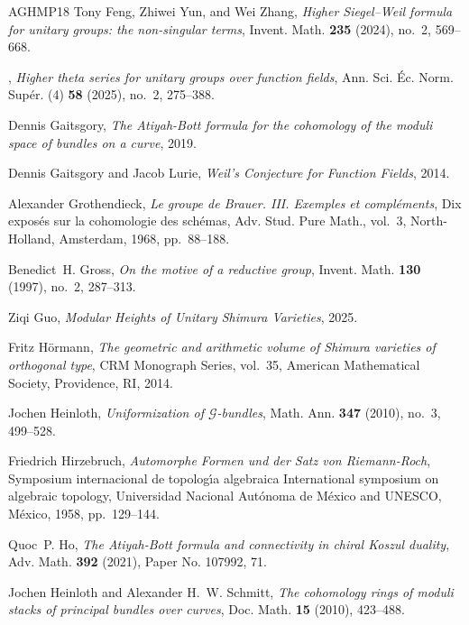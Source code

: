 \documentclass[reqno]{amsart}
\numberwithin{equation}{subsection}
\theoremstyle{definition}
\begin{document}
\begin{thebibliography}{AGHMP18}
Tony Feng, Zhiwei Yun, and Wei Zhang, \emph{Higher {S}iegel--{W}eil formula for
  unitary groups: the non-singular terms}, Invent. Math. \textbf{235} (2024),
  no.~2, 569--668.

\bysame, \emph{Higher theta series for unitary groups over function fields},
  Ann. Sci. \'{E}c. Norm. Sup\'{e}r. (4) \textbf{58} (2025), no.~2, 275--388.

Dennis Gaitsgory, \emph{The {A}tiyah-{B}ott formula for the cohomology of the
  moduli space of bundles on a curve}, 2019.

Dennis Gaitsgory and Jacob Lurie, \emph{Weil's {C}onjecture for {F}unction
  {F}ields}, 2014.

Alexander Grothendieck, \emph{Le groupe de {B}rauer. {III}. {E}xemples et
  compl\'{e}ments}, Dix expos\'{e}s sur la cohomologie des sch\'{e}mas, Adv.
  Stud. Pure Math., vol.~3, North-Holland, Amsterdam, 1968, pp.~88--188.

Benedict~H. Gross, \emph{On the motive of a reductive group}, Invent. Math.
  \textbf{130} (1997), no.~2, 287--313.

Ziqi Guo, \emph{{Modular Heights of Unitary Shimura Varieties}}, 2025.

Fritz H\"{o}rmann, \emph{The geometric and arithmetic volume of {S}himura
  varieties of orthogonal type}, CRM Monograph Series, vol.~35, American
  Mathematical Society, Providence, RI, 2014.

Jochen Heinloth, \emph{Uniformization of {$\mathscr{G}$}-bundles}, Math. Ann.
  \textbf{347} (2010), no.~3, 499--528.

Friedrich Hirzebruch, \emph{Automorphe {F}ormen und der {S}atz von
  {R}iemann-{R}och}, Symposium internacional de topolog\'{\i}a algebraica
  {I}nternational symposium on algebraic topology, Universidad Nacional
  Aut\'{o}noma de M\'{e}xico and UNESCO, M\'{e}xico, 1958, pp.~129--144.

Quoc~P. Ho, \emph{The {A}tiyah-{B}ott formula and connectivity in chiral
  {K}oszul duality}, Adv. Math. \textbf{392} (2021), Paper No. 107992, 71.

Jochen Heinloth and Alexander H.~W. Schmitt, \emph{The cohomology rings of
  moduli stacks of principal bundles over curves}, Doc. Math. \textbf{15}
  (2010), 423--488.


\end{thebibliography}
\end{document}
